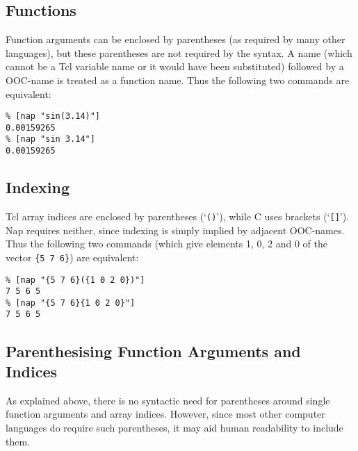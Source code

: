 \subsection{Functions}

Function arguments can be enclosed by parentheses (as required
    by many other languages), but these parentheses are not required by
    the syntax. A name (which cannot be a Tcl variable name or it would
    have been substituted) followed by a OOC-name is treated as a
    function name. Thus the following two commands are equivalent:
    \begin{verbatim}
% [nap "sin(3.14)"]
0.00159265
% [nap "sin 3.14"]
0.00159265
\end{verbatim}

\subsection{Indexing}

Tcl array indices are enclosed by parentheses (`\texttt{()}'), while C uses brackets (`\texttt{[]}'). Nap requires neither, since indexing is
    simply implied by adjacent OOC-names. Thus the following two
    commands (which give elements 1, 0, 2 and 0 of the vector 
    \texttt{\{5 7 6\}}) are equivalent:
    \begin{verbatim}
% [nap "{5 7 6}({1 0 2 0})"]
7 5 6 5
% [nap "{5 7 6}{1 0 2 0}"]
7 5 6 5
\end{verbatim}

\subsection{Parenthesising Function Arguments and Indices}

As explained above, there is no syntactic need for parentheses
    around single function arguments and array indices. However, since
    most other computer languages do require such parentheses, it may
    aid human readability to include them.
